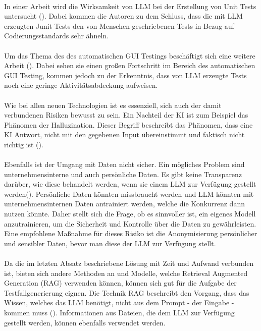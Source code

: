 \documentclass[12pt,toc=bib,toc=listof]{scrreprt}
\begin{document}
\\
In einer Arbeit wird die Wirksamkeit von LLM bei der Erstellung von Unit Tests untersucht (\cite{Ouédraogo2024}). Dabei kommen die Autoren zu dem Schluss, dass die mit LLM erzeugten Junit Tests den von Menschen geschriebenen Tests in Bezug auf Codierungsstandards sehr ähneln.\\
\\
Um das Thema des des automatischen GUI Testings beschäftigt sich eine weitere Arbeit (\cite{Liu2024}).
Dabei sehen sie einen großen Fortschritt im Bereich des automatischen GUI Testing, kommen jedoch zu der Erkenntnis, dass von LLM erzeugte Tests noch eine geringe Aktivitätsabdeckung aufweisen.\\
\\
Wie bei allen neuen Technologien ist es essenziell, sich auch der damit verbundenen Risiken bewusst zu sein. Ein Nachteil der KI ist zum Beispiel das Phänomen der Halluzination. Dieser Begriff beschreibt das Phänomen, dass eine KI Antwort, nicht mit den gegebenen Input übereinstimmt und faktisch nicht richtig ist (\cite{Siebert2024}).\\
\\
Ebenfalls ist der Umgang mit Daten nicht sicher. Ein mögliches Problem sind unternehmensinterne und auch persönliche Daten. Es gibt keine Transparenz darüber, wie diese behandelt werden, wenn sie einem LLM zur Verfügung gestellt werden(\cite{Möllers2024}). Persönliche Daten könnten missbraucht werden und LLM könnten mit unternehmensinternen Daten antrainiert werden, welche die Konkurrenz dann nutzen könnte. Daher stellt sich die Frage, ob es sinnvoller ist, ein eigenes Modell anzutrainieren, um die Sicherheit und Kontrolle über die Daten zu gewährleisten. Eine empfohlene Maßnahme für dieses Risiko ist die Anonymisierung persönlicher und sensibler Daten, bevor man diese der LLM zur Verfügung stellt.\\
\\
Da die im letzten Absatz beschriebene Lösung mit Zeit und Aufwand verbunden ist, bieten sich andere Methoden an und Modelle, welche Retrieval Augmented Generation (RAG) verwenden können, können sich gut für die Aufgabe der Testfallgenerierung eignen. Die Technik RAG beschreibt den Vorgang, dass das Wissen, welches das LLM benötigt, nicht aus dem Prompt - der Eingabe - kommen muss (\cite{Honroth2024}). Informationen aus Dateien, die dem LLM zur Verfügung gestellt werden, können ebenfalls verwendet werden.
\end{document}
